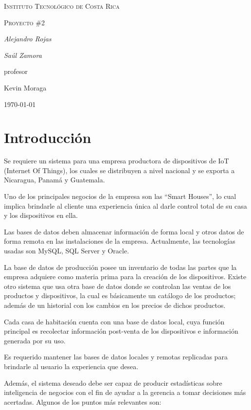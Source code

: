 \documentclass{article}
\begin{document}
\begin{titlepage}
  \centering
  {\scshape\LARGE Instituto Tecnol\'ogico de Costa Rica \par}
  \vspace{1cm}
  {\scshape\Large Proyecto \#2\par}
  \vspace{1.5cm}
  {\Large\itshape Alejandro Rojas\par}
  {\Large\itshape Sa\'ul Zamora\par}
  \vfill
  profesor\par
  Kevin Moraga \textsc{}

  \vfill

  {\large \today\par}
\end{titlepage}

\section{Introducci\'on}
Se requiere un sistema para una empresa productora de dispositivos de IoT (Internet Of Things), los cuales se distribuyen a nivel nacional y se exporta a Nicaragua, Panam\'a y Guatemala.

Uno de los principales negocios de la empresa son las ``Smart Houses'', lo cual implica brindarle al cliente una experiencia \'unica al darle control total de su casa y los dispositivos en ella.

Las bases de datos deben almacenar informaci\'on de forma local y otros datos de forma remota en las instalaciones de la empresa. Actualmente, las tecnolog\'ias usadas son MySQL, SQL Server y Oracle.

La base de datos de producci\'on posee un inventario de todas las partes que la empresa adquiere como materia prima para la creaci\'on de los dispositivos. Existe otro sistema que usa otra base de datos donde se controlan las ventas de los productos y dispositivos, la cual es b\'asicamente un cat\'alogo de los productos; adem\'as de un historial con los cambios en los precios de dichos productos.

Cada casa de habitaci\'on cuenta con una base de datos local, cuya funci\'on principal es recolectar informaci\'on post-venta de los dispositivos e informaci\'on generada por su uso.

Es requerido mantener las bases de datos locales y remotas replicadas para brindarle al usuario la experiencia que desea.

Adem\'as, el sistema deseado debe ser capaz de producir estad\'isticas sobre inteligencia de negocios con el fin de ayudar a la gerencia a tomar decisiones m\'as acertadas. Algunos de los puntos m\'as relevantes son:
\end{document}
